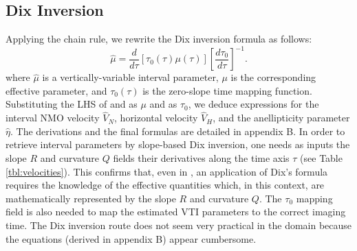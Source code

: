 \subsection{Dix Inversion}

Applying the chain rule, we  rewrite the Dix inversion formula
\citep{dix:68} as follows:
\begin{equation}
\hat{\mu}=\frac{d}{{d\tau }}\left[ {\tau _{0}(\tau )\mu (\tau )}\right] %
\left[ \frac{d{\tau }_{0}}{{d\tau }}\right] ^{-1}.  \label{eqn:dixchain}
\end{equation}
where $\hat{\mu}$ is a vertically-variable interval parameter, ${\mu}$
is the corresponding effective parameter, and $\tau_{0}(\tau)$ is the
zero-slope time mapping function. Substituting the LHS of
 and  as $\mu$ and  as
$\tau_0$, we  deduce expressions for the interval NMO velocity
$\hat{V}_{N}$, horizontal velocity $\hat{V}_{H}$, and the
anellipticity parameter $\hat{\eta}$. The derivations and the final formulas
are detailed in appendix B. In order to retrieve interval parameters
by slope-based Dix inversion, one needs as inputs the slope $R$ and
 curvature $Q$ fields   their derivatives along the time axis $\tau$
(see Table \ref{tbl:velocities}). This confirms that, even in \taup,
an application of Dix's formula requires the knowledge of the
effective quantities which, in this context, are mathematically
represented by the slope $R$ and curvature $Q$. The $\tau_0$ mapping
field is also needed to map the estimated VTI parameters to the
correct imaging time. The Dix inversion route does not seem very
practical in the \taup domain because the equations (derived in
appendix B) appear cumbersome.
	




